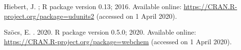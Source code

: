 \documentclass[data,datadescriptor,accept,moreauthors,pdftex]{Definitions/mdpi}
\begin{document}
\begin{thebibliography}{999}
Hiebert, J.
;
\newblock R package version 0.13;  2016.
\newblock Available online: \url{https://CRAN.R-project.org/package=udunits2}
\newblock (accessed on 1 April 2020).

Szöcs, E.
.  2020.
\newblock R package version 0.5.0;  2020.
\newblock  Available online: \url{https://CRAN.R-project.org/package=webchem}
\newblock (accessed on 1 April 2020).

\end{thebibliography}

%
%


\end{document}
